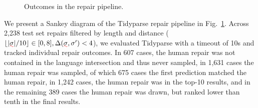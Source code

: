 \documentclass[sigplan,review,acmsmall,nonacm,screen,anonymous]{acmart}\settopmatter{printfolios=false,printccs=false,printacmref=false}
\begin{document}
\begin{figure}
\vspace{-1.13cm}
\begin{center}\resizebox{.43\textwidth}{!}{\hspace{-0.6cm}}\end{center}
\vspace{-1.1cm}
\caption{Outcomes in the repair pipeline.}
\label{fig:sankey}
\end{figure}

\noindent We present a Sankey diagram of the Tidyparse repair pipeline in Fig.~\ref{fig:sankey}. Across 2,238 test set repairs filtered by length and distance ($\lfloor|\err\sigma| / 10\rfloor \in [0, 8], \Delta(\err\sigma, \sigma') < 4$), we evaluated Tidyparse with a timeout of 10s and tracked individual repair outcomes. In 607 cases, the human repair was not contained in the language intersection and thus never sampled, in 1,631 cases the human repair was sampled, of which 675 cases the first prediction matched the human repair, in 1,242 cases, the human repair was in the top-10 results, and in the remaining 389 cases the human repair was drawn, but ranked lower than tenth in the final results.
\end{document}
